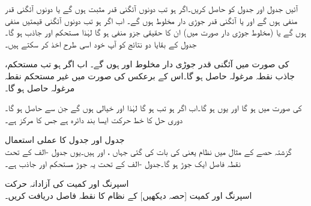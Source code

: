 آئیں جدول  اور جدول  کو حاصل کریں۔اگر  ہو تب دونوں آئگنی قدر مثبت ہوں گے یا دونوں آئگنی قدر منفی ہوں گے اور یا آئگنی قدر جوڑی دار مخلوط ہوں گے۔ اب اگر  ہو تب دونوں آئگنی قیمتیں منفی ہوں گے یا (مخلوط جوڑی دار صورت میں) ان کا حقیقی جزو منفی ہو گا لہٰذا  مستحکم اور جاذب ہو گا۔ جدول  کے بقایا دو نتائج کو آپ خود اسی طرح اخذ کر سکتے ہیں۔

  کی صورت میں آئگنی قدر جوڑی دار مخلوط  اور  ہوں گے۔ اب اگر  ہو تب مستحکم، جاذب نقطہ مرغولہ حاصل ہو گا۔اس کے برعکس  کی صورت میں غیر مستحکم نقطہ مرغولہ حاصل ہو گا۔

 کی صورت میں  ہو گا اور یوں  ہو گا۔اب اگر  ہو تب   ہو گا لہٰذا  اور  خیالی ہوں گے جن سے   حاصل ہو گا۔دوری حل کا خط حرکت ایسا بند دائرہ ہے جس کا مرکز  ہے۔

\quad جدول  اور جدول  کا عملی استعمال\\
گزشتہ حصے کے مثال  میں نظام  یعنی 
  کی بات کی گئی جہاں ،  اور  ہیں۔یوں جدول -الف کے تحت نقطہ فاصل ایک جوڑ ہو گا۔جدول -الف کے تحت یہ جوڑ مستحکم اور جاذب ہے۔

\quad اسپرنگ اور کمیت کی آزادانہ حرکت\\
اسپرنگ اور کمیت [حصہ  دیکھیں] کے نظام  کا نقطہ فاصل دریافت کریں۔

